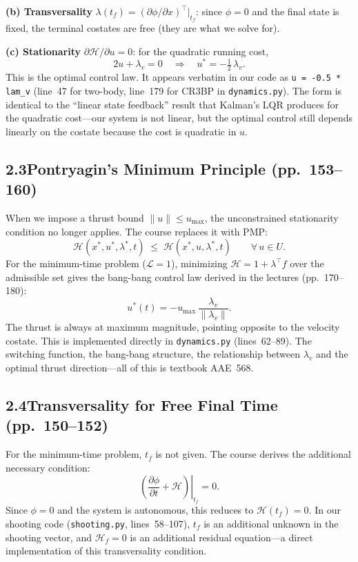 \documentclass[11pt,letterpaper]{article}
\begin{document}
\medskip
\noindent\textbf{(b) Transversality} $\lambda(t_f) = (\partial\phi/\partial x)^\top|_{t_f}$: since $\phi = 0$ and the final state is fixed, the terminal costates are free (they are what we solve for).

\medskip
\noindent\textbf{(c) Stationarity} $\partial\mathcal{H}/\partial u = 0$: for the quadratic running cost,
\[
  2u + \lambda_v = 0
  \quad\Longrightarrow\quad
  u^* = -\tfrac{1}{2}\,\lambda_v.
\]
This is the optimal control law. It appears verbatim in our code as \texttt{u = -0.5 * lam\_v} (line~47 for two-body, line~179 for CR3BP in \texttt{dynamics.py}). The form is identical to the ``linear state feedback'' result that Kalman's LQR produces for the quadratic cost---our system is not linear, but the optimal control still depends linearly on the costate because the cost is quadratic in $u$.


\subsection{2.3\quad Pontryagin's Minimum Principle (pp.~153--160)}

When we impose a thrust bound $\|u\| \leq u_{\max}$, the unconstrained stationarity condition no longer applies. The course replaces it with PMP:
\[
  \mathcal{H}(x^*,u^*,\lambda^*,t)
  \;\leq\;
  \mathcal{H}(x^*,u,\lambda^*,t)
  \qquad \forall\, u \in U.
\]
For the minimum-time problem ($\mathcal{L}=1$), minimizing $\mathcal{H} = 1 + \lambda^\top f$ over the admissible set gives the bang-bang control law derived in the lectures (pp.~170--180):
\[
  u^*(t) = -u_{\max}\,\frac{\lambda_v}{\|\lambda_v\|}.
\]
The thrust is always at maximum magnitude, pointing opposite to the velocity costate. This is implemented directly in \texttt{dynamics.py} (lines~62--89). The switching function, the bang-bang structure, the relationship between $\lambda_v$ and the optimal thrust direction---all of this is textbook AAE~568.


\subsection{2.4\quad Transversality for Free Final Time (pp.~150--152)}

For the minimum-time problem, $t_f$ is not given. The course derives the additional necessary condition:
\[
  \left.\left(\frac{\partial\phi}{\partial t} + \mathcal{H}\right)\right|_{t_f} = 0.
\]
Since $\phi=0$ and the system is autonomous, this reduces to $\mathcal{H}(t_f) = 0$. In our shooting code (\texttt{shooting.py}, lines~58--107), $t_f$ is an additional unknown in the shooting vector, and $\mathcal{H}_f = 0$ is an additional residual equation---a direct implementation of this transversality condition.
\end{document}
